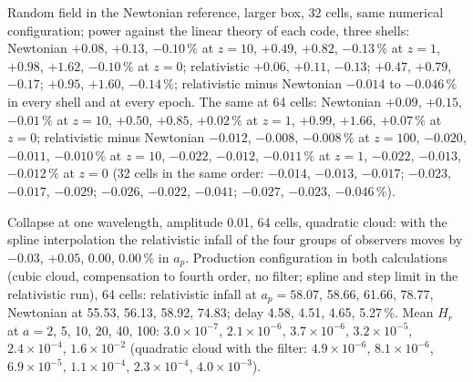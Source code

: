 \documentclass[aps,prd,twocolumn,10pt,superscriptaddress,nofootinbib,longbibliography,floatfix]{revtex4-2}
\begin{document}
Random field in the Newtonian reference, larger box, 32 cells, same numerical configuration; power against the linear theory of each code, three shells: Newtonian $+0.08$, $+0.13$, $-0.10\,\%$ at $z = 10$, $+0.49$, $+0.82$, $-0.13\,\%$ at $z = 1$, $+0.98$, $+1.62$, $-0.10\,\%$ at $z = 0$; relativistic $+0.06$, $+0.11$, $-0.13$; $+0.47$, $+0.79$, $-0.17$; $+0.95$, $+1.60$, $-0.14\,\%$; relativistic minus Newtonian $-0.014$ to $-0.046\,\%$ in every shell and at every epoch. The same at 64 cells: Newtonian $+0.09$, $+0.15$, $-0.01\,\%$ at $z = 10$, $+0.50$, $+0.85$, $+0.02\,\%$ at $z = 1$, $+0.99$, $+1.66$, $+0.07\,\%$ at $z = 0$; relativistic minus Newtonian $-0.012$, $-0.008$, $-0.008\,\%$ at $z = 100$, $-0.020$, $-0.011$, $-0.010\,\%$ at $z = 10$, $-0.022$, $-0.012$, $-0.011\,\%$ at $z = 1$, $-0.022$, $-0.013$, $-0.012\,\%$ at $z = 0$ (32 cells in the same order: $-0.014$, $-0.013$, $-0.017$; $-0.023$, $-0.017$, $-0.029$; $-0.026$, $-0.022$, $-0.041$; $-0.027$, $-0.023$, $-0.046\,\%$).

Collapse at one wavelength, amplitude 0.01, 64 cells, quadratic cloud: with the spline interpolation the relativistic infall of the four groups of observers moves by $-0.03$, $+0.05$, $0.00$, $0.00\,\%$ in $a_p$. Production configuration in both calculations (cubic cloud, compensation to fourth order, no filter; spline and step limit in the relativistic run), 64 cells: relativistic infall at $a_p = 58.07$, 58.66, 61.66, 78.77, Newtonian at 55.53, 56.13, 58.92, 74.83; delay 4.58, 4.51, 4.65, 5.27\,\%. Mean $H_r$ at $a = 2$, 5, 10, 20, 40, 100: $3.0\times10^{-7}$, $2.1\times10^{-6}$, $3.7\times10^{-6}$, $3.2\times10^{-5}$, $2.4\times10^{-4}$, $1.6\times10^{-2}$ (quadratic cloud with the filter: $4.9\times10^{-6}$, $8.1\times10^{-6}$, $6.9\times10^{-5}$, $1.1\times10^{-4}$, $2.3\times10^{-4}$, $4.0\times10^{-3}$).
\end{document}
